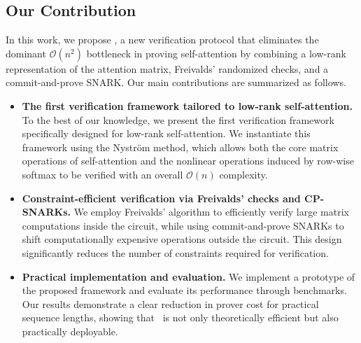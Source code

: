 \documentclass[letterpaper,twocolumn,10pt]{article}
\begin{document}
\subsection{Our Contribution}
In this work, we propose \name, a new verification protocol that eliminates the dominant $\mathcal{O}(n^2)$ bottleneck in proving self-attention by combining a low-rank representation of the attention matrix, Freivalds’ randomized checks, and a commit-and-prove SNARK. Our main contributions are summarized as follows.
\begin{itemize}
    \item \textbf{The first verification framework tailored to low-rank self-attention.}
    To the best of our knowledge, we present the first verification framework specifically designed for low-rank self-attention. We instantiate this framework using the Nyström method, which allows both the core matrix operations of self-attention and the nonlinear operations induced by row-wise softmax to be verified with an overall $\mathcal{O}(n)$ complexity.
    
    \item \textbf{Constraint-efficient verification via Freivalds’ checks and CP-SNARKs.}
    We employ Freivalds’ algorithm to efficiently verify large matrix computations inside the circuit, while using commit-and-prove SNARKs to shift computationally expensive operations outside the circuit. This design significantly reduces the number of constraints required for verification.

    \item \textbf{Practical implementation and evaluation.}
    We implement a prototype of the proposed framework and evaluate its performance through benchmarks. Our results demonstrate a clear reduction in prover cost for practical sequence lengths, showing that \name\ is not only theoretically efficient but also practically deployable.
\end{itemize}
\end{document}
